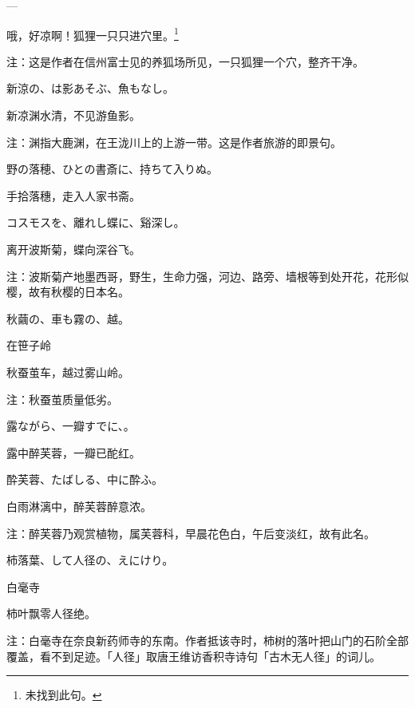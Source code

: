 \begin{haiku}
    {\FH ---}

    {\FK 哦，好凉啊！狐狸一只只进穴里。\footnote{\FT 未找到此句。}}

    {\FT 注：这是作者在信州富士见的养狐场所见，一只狐狸一个穴，整齐干净。}
\end{haiku}

\begin{haiku}
    {\FH 新涼の、は影あそぶ、魚もなし。}

    {\FK 新凉渊水清，不见游鱼影。}

    {\FT 注：渊指大鹿渊，在王泷川上的上游一带。这是作者旅游的即景句。}
\end{haiku}

\begin{haiku}
    {\FH 野の落穂、ひとの書斎に、持ちて入りぬ。}

    {\FK 手拾落穗，走入人家书斋。}
\end{haiku}

\begin{haiku}
    {\FH コスモスを、離れし蝶に、谿深し。}

    {\FK 离开波斯菊，蝶向深谷飞。}

    {\FT 注：波斯菊产地墨西哥，野生，生命力强，河边、路旁、墙根等到处开花，花形似樱，故有秋樱的日本名。}
\end{haiku}

\begin{haiku}
    {\FH 秋繭の、車も霧の、越。}

    {\FK 在笹子岭}

    {\FK 秋蚕茧车，越过雾山岭。}

    {\FT 注：秋蚕茧质量低劣。}
\end{haiku}

\begin{haiku}
    {\FH 露ながら、一瓣すでに、。}

    {\FK 露中醉芙蓉，一瓣已酡红。}
\end{haiku}

\begin{haiku}
    {\FH 酔芙蓉、たばしる、中に酔ふ。}

    {\FK 白雨淋漓中，醉芙蓉醉意浓。}

    {\FT 注：醉芙蓉乃观赏植物，属芙蓉科，早晨花色白，午后变淡红，故有此名。}
\end{haiku}

\begin{haiku}
    {\FH 柿落葉、して人径の、えにけり。}

    {\FK 白毫寺}

    {\FK 柿叶飘零人径绝。}

    {\FT 注：白毫寺在奈良新药师寺的东南。作者抵该寺时，柿树的落叶把山门的石阶全部覆盖，看不到足迹。「人径」取唐王维访香积寺诗句「古木无人径」的词儿。}
\end{haiku}

